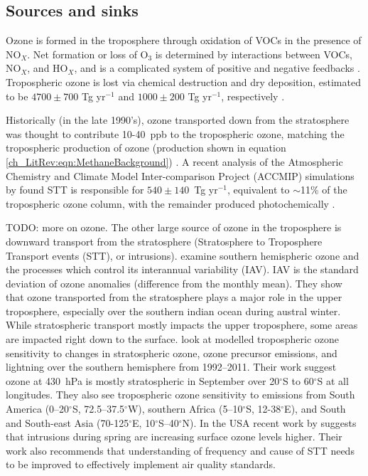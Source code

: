   \subsection{Sources and sinks}
  
    Ozone is formed in the troposphere through oxidation of VOCs in the presence of NO$_X$.
    Net formation or loss of O$_3$ is determined by interactions between VOCs, NO$_X$, and HO$_X$, and is a complicated system of positive and negative feedbacks \citep{Atkinson2000}.
    Tropospheric ozone is lost via chemical destruction and dry deposition, estimated to be $4700\pm700$ Tg yr$^{-1}$ and $1000\pm200$ Tg yr$^{-1}$, respectively \citep{Stevenson2006}. 
    
    Historically (in the late 1990's), ozone transported down from the stratosphere was thought to contribute 10-40~ppb to the tropospheric ozone,  matching the tropospheric production of ozone (production shown in equation \ref{ch_LitRev:eqn:MethaneBackground}) \citep{Atkinson2000,Stohl2003}.
    A recent analysis of the Atmospheric Chemistry and Climate Model Inter-comparison Project (ACCMIP) simulations by \citet{Young2013} found STT is responsible for $540\pm140$~Tg yr$^{-1}$, equivalent to $\sim$11\% of the tropospheric ozone column, with the remainder produced photochemically \citep{Monks2015}.

    TODO: more on ozone.
    The other large source of ozone in the troposphere is downward transport from the stratosphere (Stratosphere to Troposphere Transport events (STT), or intrusions).
    \cite{Liu2017} examine southern hemispheric ozone and the processes which control its interannual variability (IAV).
    IAV is the standard deviation of ozone anomalies (difference from the monthly mean).
    They show that ozone transported from the stratosphere plays a major role in the upper troposphere, especially over the southern indian ocean during austral winter.
    While stratospheric transport mostly impacts the upper troposphere, some areas are impacted right down to the surface.
    \citet{Liu2017} look at modelled tropospheric ozone sensitivity to changes in stratospheric ozone, ozone precursor emissions, and lightning over the southern hemisphere from 1992--2011. 
    Their work suggest ozone at 430~hPa is mostly stratospheric in September over 20$^{\circ}$S to 60$^{\circ}$S at all longitudes.
    They also see tropospheric ozone sensitivity to emissions from South America (0--20$^{\circ}$S, 72.5--37.5$^{\circ}$W), southern Africa (5--10$^{\circ}$S, 12-38$^{\circ}$E), and South and South-east Asia (70-125$^{\circ}$E, 10$^{\circ}$S--40$^{\circ}$N).
    In the USA recent work by \cite{Lin2015} suggests that intrusions during spring are increasing surface ozone levels higher.
    Their work also recommends that understanding of frequency and cause of STT needs to be improved to effectively implement air quality standards.
  
